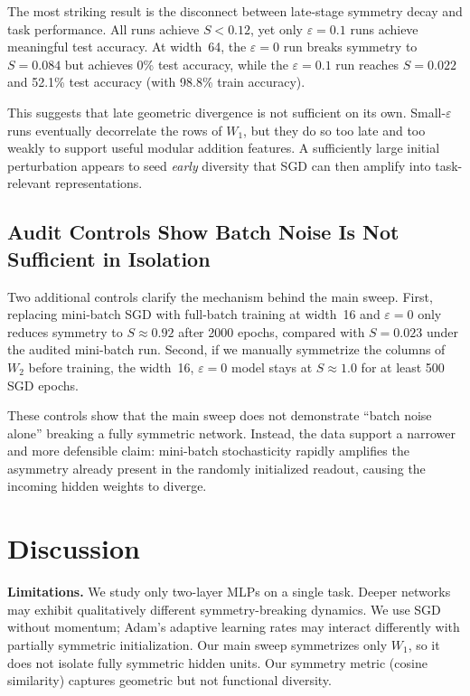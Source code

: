 \documentclass[11pt,a4paper]{article}
\begin{document}
The most striking result is the disconnect between late-stage symmetry decay and task performance.
All runs achieve $S < 0.12$, yet only $\varepsilon = 0.1$ runs achieve meaningful test accuracy.
At width~64, the $\varepsilon = 0$ run breaks symmetry to $S = 0.084$ but achieves 0\% test accuracy, while the $\varepsilon = 0.1$ run reaches $S = 0.022$ and 52.1\% test accuracy (with 98.8\% train accuracy).

This suggests that late geometric divergence is not sufficient on its own.
Small-$\varepsilon$ runs eventually decorrelate the rows of $W_1$, but they do so too late and too weakly to support useful modular addition features.
A sufficiently large initial perturbation appears to seed \emph{early} diversity that SGD can then amplify into task-relevant representations.

\subsection{Audit Controls Show Batch Noise Is Not Sufficient in Isolation}

Two additional controls clarify the mechanism behind the main sweep.
First, replacing mini-batch SGD with full-batch training at width~16 and $\varepsilon = 0$ only reduces symmetry to $S \approx 0.92$ after 2000 epochs, compared with $S = 0.023$ under the audited mini-batch run.
Second, if we manually symmetrize the columns of $W_2$ before training, the width~16, $\varepsilon = 0$ model stays at $S \approx 1.0$ for at least 500 SGD epochs.

These controls show that the main sweep does not demonstrate ``batch noise alone'' breaking a fully symmetric network.
Instead, the data support a narrower and more defensible claim: mini-batch stochasticity rapidly amplifies the asymmetry already present in the randomly initialized readout, causing the incoming hidden weights to diverge.

\section{Discussion}

\textbf{Limitations.}
We study only two-layer MLPs on a single task. Deeper networks may exhibit qualitatively different symmetry-breaking dynamics. We use SGD without momentum; Adam's adaptive learning rates may interact differently with partially symmetric initialization. Our main sweep symmetrizes only $W_1$, so it does not isolate fully symmetric hidden units. Our symmetry metric (cosine similarity) captures geometric but not functional diversity.
\end{document}
